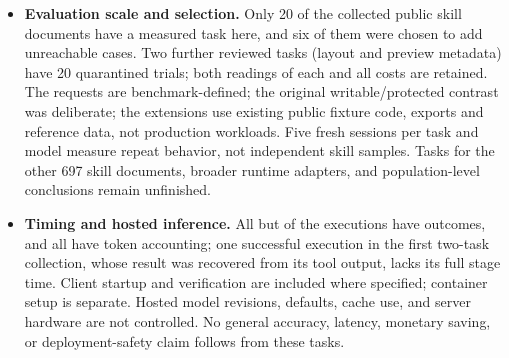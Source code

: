 \documentclass{article}
\theoremstyle{plain}
\theoremstyle{definition}
\begin{document}
\begin{itemize}
packs, do not establish a population rate of wrong blocks, nor do they
prove that compaction is faithful.
\item \textbf{Evaluation scale and selection.} Only 20 of the
\PilotSourceCount{} collected public skill documents have a measured task
here, and six of them were chosen to add unreachable cases. Two further reviewed tasks (layout and preview metadata) have 20
quarantined trials; both readings of each and all costs are retained.
The requests are benchmark-defined; the original
writable/protected contrast was deliberate; the extensions use existing
public fixture code, exports and reference data, not production workloads. Five fresh sessions
per task and model measure repeat behavior, not independent skill samples.
Tasks for the other 697 skill documents, broader
runtime adapters, and population-level conclusions remain unfinished.
\item \textbf{Timing and hosted inference.} All but \ValueUnresolved{} of the
\ValueTrials{} executions have outcomes, and all have token accounting; one successful execution
in the first two-task collection, whose result was recovered from its tool
output, lacks its full stage time. Client startup
and verification are included where specified;
container setup is separate. Hosted model revisions, defaults, cache use,
and server hardware are not controlled. No general accuracy, latency,
monetary saving, or deployment-safety claim follows from these tasks.


\end{itemize}
\end{document}
